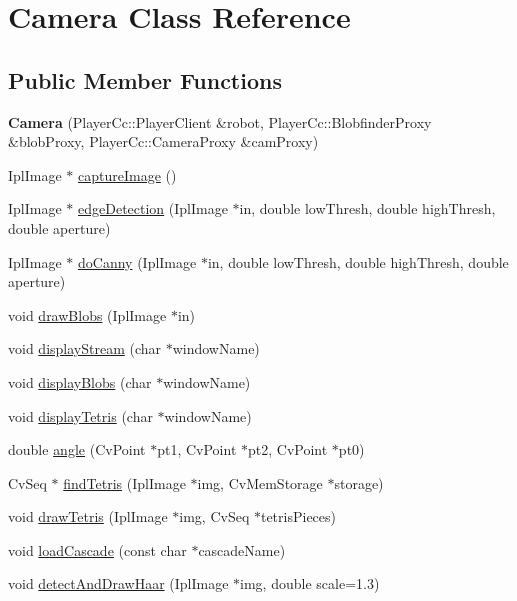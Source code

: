 \hypertarget{classCamera}{
\section{Camera Class Reference}
\label{classCamera}
}
\subsection*{Public Member Functions}
\begin{DoxyCompactItemize}
\item 
\hypertarget{classCamera_abf9aaac18c8a268705dd7009017ce961}{
{\bfseries Camera} (PlayerCc::PlayerClient \&robot, PlayerCc::BlobfinderProxy \&blobProxy, PlayerCc::CameraProxy \&camProxy)}
\label{classCamera_abf9aaac18c8a268705dd7009017ce961}

\item 
IplImage $\ast$ \hyperlink{classCamera_a02d5576415e72e46c717f6b1221fa4a4}{captureImage} ()
\item 
IplImage $\ast$ \hyperlink{classCamera_a9d6533c84114b0724d28b940ed774362}{edgeDetection} (IplImage $\ast$in, double lowThresh, double highThresh, double aperture)
\item 
IplImage $\ast$ \hyperlink{classCamera_ac5c9f313998f788fa4924a1a341fd96a}{doCanny} (IplImage $\ast$in, double lowThresh, double highThresh, double aperture)
\item 
void \hyperlink{classCamera_ab2cdb9c79a3058c31fe3ccd04c8b4982}{drawBlobs} (IplImage $\ast$in)
\item 
void \hyperlink{classCamera_a291c3ab32f380f2e8e9258793daeff5d}{displayStream} (char $\ast$windowName)
\item 
void \hyperlink{classCamera_af4d89ca5c815928bdf8cf1cf8cb0f058}{displayBlobs} (char $\ast$windowName)
\item 
void \hyperlink{classCamera_a5ac21f1748d653d29a4173814386029c}{displayTetris} (char $\ast$windowName)
\item 
double \hyperlink{classCamera_a5d6b9a8b9772301c7fd6be163bea0187}{angle} (CvPoint $\ast$pt1, CvPoint $\ast$pt2, CvPoint $\ast$pt0)
\item 
CvSeq $\ast$ \hyperlink{classCamera_a21b8d96617b3fede0373a7af8f998bb6}{findTetris} (IplImage $\ast$img, CvMemStorage $\ast$storage)
\item 
void \hyperlink{classCamera_a7b2811cc03fcdafa686a76863f2847c1}{drawTetris} (IplImage $\ast$img, CvSeq $\ast$tetrisPieces)
\item 
void \hyperlink{classCamera_ae03f9b6de6de4ff54394006116901cf1}{loadCascade} (const char $\ast$cascadeName)
\item 
void \hyperlink{classCamera_a463b40c912469d22df3ca81bb85bbf60}{detectAndDrawHaar} (IplImage $\ast$img, double scale=1.3)
\end{DoxyCompactItemize}


